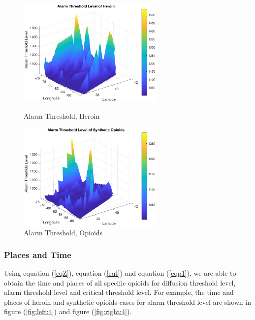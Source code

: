 \documentclass{mcmthesis}
\numberwithin{equation}{section}
\numberwithin{figure}{section}
\numberwithin{table}{section}
\theoremstyle{mydef}
\begin{document}
 \begin{figure}[!htbp]
\begin{minipage}[t]{0.5\linewidth}
\centering
\includegraphics[width=2.8in]{./picture/athe.eps}
\caption{Alarm Threshold, Heroin}
\label{fig:left:3}
\end{minipage}%
\begin{minipage}[t]{0.5\linewidth}
\centering
\includegraphics[width=2.8in]{./picture/atso.eps}
\caption{Alarm Threshold, Opioids}
\label{fig:right:3}
\end{minipage}
\end{figure} 

\subsubsection{Places and Time}

Using equation (\ref{eqZ}), equation (\ref{eqt}) and equation (\ref{eqp1}), we are able to obtain the time and places of all specific opioids for diffusion threshold level, alarm threshold level and critical threshold level. For example, the time and places of heroin and synthetic opioids cases for alarm threshold level are shown in figure (\ref{fig:left:4}) and figure (\ref{fig:right:4}).
\end{document}
